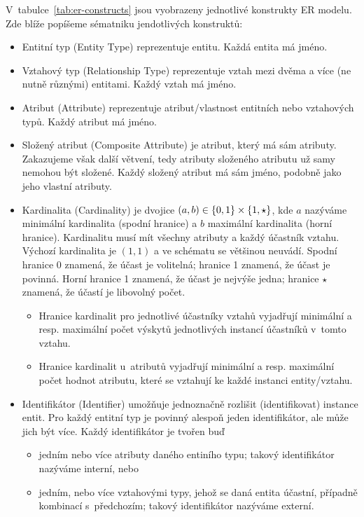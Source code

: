 V~tabulce~\ref{tab:er-constructs} jsou vyobrazeny jednotlivé konstrukty ER modelu.
Zde blíže popíšeme sématniku jendotlivých konstruktů:
\begin{itemize}
  \item Entitní typ (Entity Type) reprezentuje entitu.
        Každá entita má jméno.
  \item Vztahový typ (Relationship Type) reprezentuje vztah mezi dvěma a více (ne nutně různými) entitami.
        Každý vztah má jméno.
  \item Atribut (Attribute) reprezentuje atribut/vlastnost entitních nebo vztahových typů.
        Každý atribut má jméno.
  \item Složený atribut (Composite Attribute) je atribut, který má sám atributy.
        Zakazujeme však další větvení, tedy atributy složeného atributu už samy nemohou být složené.
        Každý složený atribut má sám jméno, podobně jako jeho vlastní atributy.
  \item Kardinalita (Cardinality) je dvojice $(a, b) \in \left\{0, 1\right\}\times \left\{1, \star\right\}$, kde $a$ nazýváme minimální kardinalita (spodní hranice) a $b$ maximální kardinalita (horní hranice).
        Kardinalitu musí mít všechny atributy a každý účastník vztahu.
        Výchozí kardinalita je $(1, 1)$ a ve schématu se většinou neuvádí.
        Spodní hranice 0 znamená, že účast je volitelná; hranice 1 znamená, že účast je povinná.
        Horní hranice 1 znamená, že účast je nejvýše jedna; hranice $\star$ znamená, že účastí je libovolný počet.
        \begin{itemize}
          \item Hranice kardinalit pro jednotlivé účastníky vztahů vyjadřují minimální a resp. maximální počet výskytů jednotlivých instancí účastníků v~tomto vztahu.
          \item Hranice kardinalit u~atributů vyjadřují minimální a resp. maximální počet hodnot atributu, které se vztahují ke každé instanci entity/vztahu.
        \end{itemize}
  \item Identifikátor (Identifier) umožňuje jednoznačně rozlišit (identifikovat) instance entit.
        Pro každý entitní typ je povinný alespoň jeden identifikátor, ale může jich být více.
        Každý identifikátor je tvořen buď
        \begin{itemize}
          \item jedním nebo více atributy daného entiního typu; takový identifikátor nazýváme interní, nebo
          \item jedním, nebo více vztahovými typy, jehož se daná entita účastní, případně kombinací s~předchozím; takový identifikátor nazýváme externí.
        \end{itemize}
\end{itemize}

